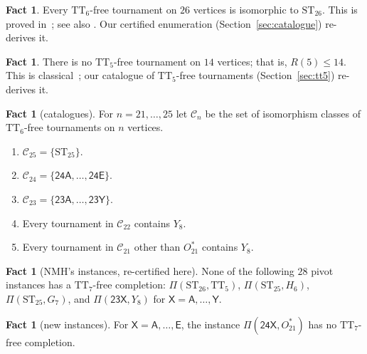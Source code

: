 \documentclass[11pt]{amsart}
\theoremstyle{definition}
\newtheorem{fact}[theorem]{Fact}
\theoremstyle{remark}
\newcommand{\TT}[1]{\mathrm{TT}_{#1}}
\newcommand{\ST}[1]{\mathrm{ST}_{#1}}
\newcommand{\Ostar}{O_{21}^{*}}
\newcommand{\cl}[1]{\textsf{#1}}
\newcommand{\Piv}[2]{\Pi(#1,#2)}
\begin{document}
\begin{fact}\label{fact:st26}
Every $\TT{6}$-free tournament on $26$ vertices is isomorphic to $\ST{26}$.
This is proved in~\cite{SF98}; see also \cite[\S2]{NMH22}. Our certified
enumeration (Section~\ref{sec:catalogue}) re-derives it.
\end{fact}

\begin{fact}\label{fact:tt5}
There is no $\TT{5}$-free tournament on $14$ vertices; that is,
$R(5) \le 14$. This is classical~\cite{RP70}; our catalogue of
$\TT{5}$-free tournaments (Section~\ref{sec:tt5}) re-derives it.
\end{fact}

\begin{fact}[catalogues]\label{fact:cat}
For $n=21,\dots,25$ let $\mathcal{C}_n$ be the set of isomorphism classes of
$\TT{6}$-free tournaments on $n$ vertices.
\begin{enumerate}[label=(\alph*)]
\item\label{cat25} $\mathcal{C}_{25} = \{\ST{25}\}$.
\item\label{cat24} $\mathcal{C}_{24} = \{\cl{24A},\dots,\cl{24E}\}$.
\item\label{cat23} $\mathcal{C}_{23} = \{\cl{23A},\dots,\cl{23Y}\}$.
\item\label{cat22} Every tournament in $\mathcal{C}_{22}$ contains $Y_8$.
\item\label{cat21} Every tournament in $\mathcal{C}_{21}$ other than $\Ostar$
  contains $Y_8$.
\end{enumerate}
\end{fact}

\begin{fact}[NMH's instances, re-certified here]\label{fact:nmh}
None of the following $28$ pivot instances has a $\TT{7}$-free completion:
$\Piv{\ST{26}}{\TT{5}}$, $\Piv{\ST{25}}{H_6}$, $\Piv{\ST{25}}{G_7}$, and
$\Piv{\cl{23X}}{Y_8}$ for $\cl{X}=\cl{A},\dots,\cl{Y}$.
\end{fact}

\begin{fact}[new instances]\label{fact:new}
For $\cl{X}=\cl{A},\dots,\cl{E}$, the instance $\Piv{\cl{24X}}{\Ostar}$ has no
$\TT{7}$-free completion.
\end{fact}
\end{document}
